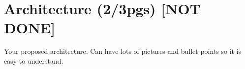 
% 
% 

\section{Architecture (2/3pgs)  [NOT DONE]}

Your proposed architecture. Can have lots of pictures and bullet points so it is easy to understand.
